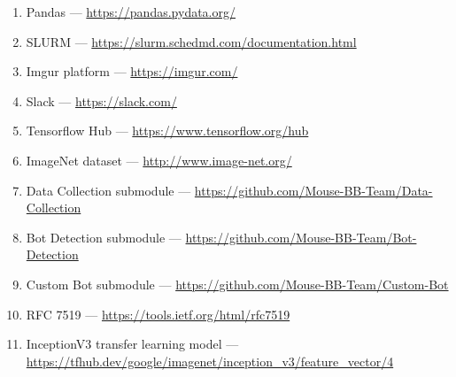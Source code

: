 \begin{enumerate}
    \item Pandas --- \url{https://pandas.pydata.org/}\label{itm:pandas}
    \item SLURM --- \url{https://slurm.schedmd.com/documentation.html}\label{itm:slurm}
    \item Imgur platform --- \url{https://imgur.com/}\label{itm:imgur}
    \item Slack --- \url{https://slack.com/}\label{itm:slack}
    \item Tensorflow Hub --- \url{https://www.tensorflow.org/hub}\label{itm:tensorflow-hub}
    \item ImageNet dataset --- \url{http://www.image-net.org/}\label{itm:image-net}
    \item Data Collection submodule --- \url{https://github.com/Mouse-BB-Team/Data-Collection}\label{itm:data-collection}
    \item Bot Detection submodule --- \url{https://github.com/Mouse-BB-Team/Bot-Detection}\label{itm:bot-detection}
    \item Custom Bot submodule --- \url{https://github.com/Mouse-BB-Team/Custom-Bot}\label{itm:custom-bot}
    \item RFC 7519 --- \url{https://tools.ietf.org/html/rfc7519}\label{itm:rfc-jwt}
    \item InceptionV3 transfer learning model --- \url{https://tfhub.dev/google/imagenet/inception_v3/feature_vector/4}\label{itm:inceptionV3}
\end{enumerate}
\newpage
\thispagestyle{appendix}